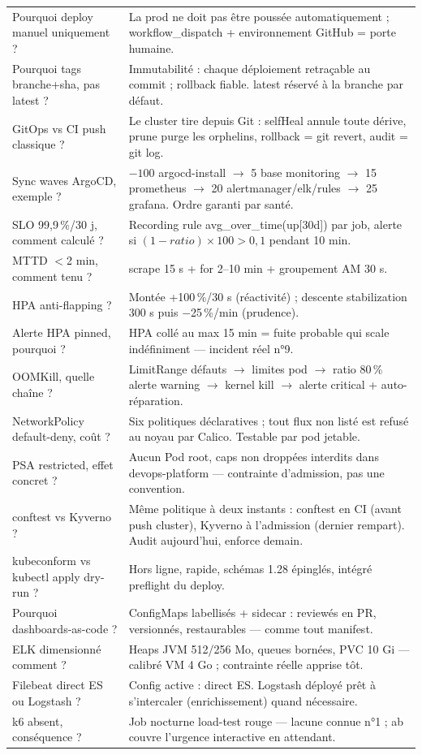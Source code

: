 \documentclass[12pt,a4paper]{article}
\begin{document}
\begin{longtable}{@{}p{6.2cm}p{8.0cm}@{}}
Pourquoi deploy manuel uniquement ? & La prod ne doit pas être poussée automatiquement ; workflow\_dispatch + environnement GitHub = porte humaine. \\
Pourquoi tags branche+sha, pas latest ? & Immutabilité : chaque déploiement retraçable au commit ; rollback fiable. latest réservé à la branche par défaut. \\
GitOps vs CI push classique ? & Le cluster tire depuis Git : selfHeal annule toute dérive, prune purge les orphelins, rollback = git revert, audit = git log. \\
Sync waves ArgoCD, exemple ? & $-100$ argocd-install $\rightarrow$ 5 base monitoring $\rightarrow$ 15 prometheus $\rightarrow$ 20 alertmanager/elk/rules $\rightarrow$ 25 grafana. Ordre garanti par santé. \\
SLO 99,9\,\%/30 j, comment calculé ? & Recording rule avg\_over\_time(up[30d]) par job, alerte si $(1-ratio)\times100 > 0,1$ pendant 10 min. \\
MTTD $<$2 min, comment tenu ? & scrape 15 s + for 2--10 min + groupement AM 30 s. \\
HPA anti-flapping ? & Montée +100\,\%/30 s (réactivité) ; descente stabilization 300 s puis $-$25\,\%/min (prudence). \\
Alerte HPA pinned, pourquoi ? & HPA collé au max 15 min = fuite probable qui scale indéfiniment --- incident réel n°9. \\
OOMKill, quelle chaîne ? & LimitRange défauts $\rightarrow$ limites pod $\rightarrow$ ratio 80\,\% alerte warning $\rightarrow$ kernel kill $\rightarrow$ alerte critical + auto-réparation. \\
NetworkPolicy default-deny, coût ? & Six politiques déclaratives ; tout flux non listé est refusé au noyau par Calico. Testable par pod jetable. \\
PSA restricted, effet concret ? & Aucun Pod root, caps non droppées interdits dans devops-platform --- contrainte d'admission, pas une convention. \\
conftest vs Kyverno ? & Même politique à deux instants : conftest en CI (avant push cluster), Kyverno à l'admission (dernier rempart). Audit aujourd'hui, enforce demain. \\
kubeconform vs kubectl apply dry-run ? & Hors ligne, rapide, schémas 1.28 épinglés, intégré preflight du deploy. \\
Pourquoi dashboards-as-code ? & ConfigMaps labellisés + sidecar : reviewés en PR, versionnés, restaurables --- comme tout manifest. \\
ELK dimensionné comment ? & Heaps JVM 512/256 Mo, queues bornées, PVC 10 Gi --- calibré VM 4 Go ; contrainte réelle apprise tôt. \\
Filebeat direct ES ou Logstash ? & Config active : direct ES. Logstash déployé prêt à s'intercaler (enrichissement) quand nécessaire. \\
k6 absent, conséquence ? & Job nocturne load-test rouge --- lacune connue n°1 ; ab couvre l'urgence interactive en attendant. \\
\bottomrule
\end{longtable}
\end{document}

